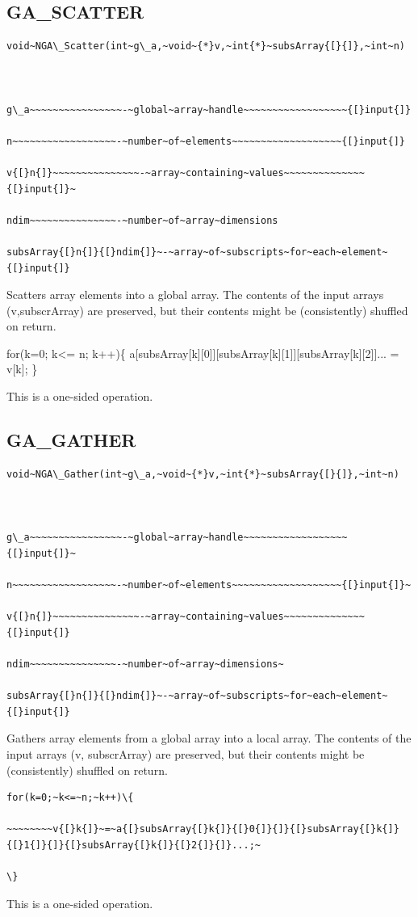 \subsection*{\label{sub:GA_SCATTER}GA\_SCATTER}
\begin{verbatim}
void~NGA\_Scatter(int~g\_a,~void~{*}v,~int{*}~subsArray{[}{]},~int~n)



g\_a~~~~~~~~~~~~~~~~-~global~array~handle~~~~~~~~~~~~~~~~~~{[}input{]}

n~~~~~~~~~~~~~~~~~~-~number~of~elements~~~~~~~~~~~~~~~~~~~{[}input{]}

v{[}n{]}~~~~~~~~~~~~~~~-~array~containing~values~~~~~~~~~~~~~~{[}input{]}~

ndim~~~~~~~~~~~~~~~-~number~of~array~dimensions

subsArray{[}n{]}{[}ndim{]}~-~array~of~subscripts~for~each~element~{[}input{]}
\end{verbatim}
Scatters array elements into a global array. The contents of the input
arrays (v,subscrArray) are preserved, but their contents might be
(consistently) shuffled on return.

for(k=0; k<= n; k++)\{ a{[}subsArray{[}k{]}{[}0{]}{]}{[}subsArray{[}k{]}{[}1{]}{]}{[}subsArray{[}k{]}{[}2{]}{]}...
= v{[}k{]}; \}

This is a one-sided operation.


\subsection*{\label{sub:GA_GATHER}GA\_GATHER}
\begin{verbatim}
void~NGA\_Gather(int~g\_a,~void~{*}v,~int{*}~subsArray{[}{]},~int~n)



g\_a~~~~~~~~~~~~~~~~-~global~array~handle~~~~~~~~~~~~~~~~~~{[}input{]}~

n~~~~~~~~~~~~~~~~~~-~number~of~elements~~~~~~~~~~~~~~~~~~~{[}input{]}~

v{[}n{]}~~~~~~~~~~~~~~~-~array~containing~values~~~~~~~~~~~~~~{[}input{]}

ndim~~~~~~~~~~~~~~~-~number~of~array~dimensions~

subsArray{[}n{]}{[}ndim{]}~-~array~of~subscripts~for~each~element~{[}input{]}
\end{verbatim}
Gathers array elements from a global array into a local array. The
contents of the input arrays (v, subscrArray) are preserved, but their
contents might be (consistently) shuffled on return.
\begin{verbatim}
for(k=0;~k<=~n;~k++)\{

~~~~~~~~v{[}k{]}~=~a{[}subsArray{[}k{]}{[}0{]}{]}{[}subsArray{[}k{]}{[}1{]}{]}{[}subsArray{[}k{]}{[}2{]}{]}...;~

\}
\end{verbatim}
This is a one-sided operation. 


